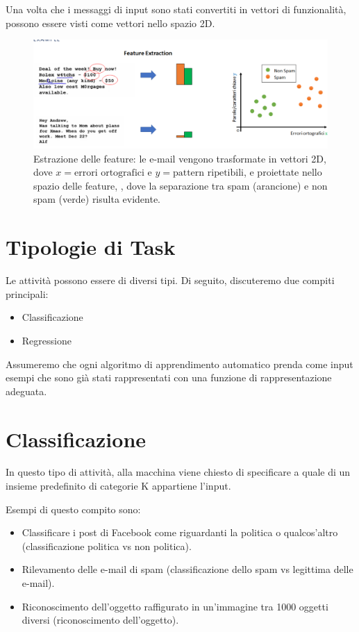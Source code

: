 Una volta che i messaggi di input sono stati convertiti in vettori di funzionalità, possono essere visti come vettori nello spazio 2D.

\begin{figure}[htbp]
    \centering
    \includegraphics[width=\textwidth]{images/featureExtraction.png}
    \caption{Estrazione delle feature: le e-mail vengono trasformate in vettori 2D, dove $x = \text{errori ortografici e } y = \text{pattern ripetibili}$, e proiettate nello spazio delle feature, , dove la separazione tra spam (arancione) e non spam (verde) risulta evidente.}
    \label{fig:featureExtraction}
\end{figure}

\section{Tipologie di Task}

Le attività possono essere di diversi tipi. Di seguito, discuteremo due compiti principali:

\begin{itemize}
\item Classificazione
\item Regressione
\end{itemize}

Assumeremo che ogni algoritmo di apprendimento automatico prenda come input esempi che sono già stati rappresentati con una funzione di rappresentazione adeguata.

\section{Classificazione}

In questo tipo di attività, alla macchina viene chiesto di specificare a quale di un insieme predefinito di categorie K appartiene l'input.

\noindent
Esempi di questo compito sono:

\begin{itemize}
\item Classificare i post di Facebook come riguardanti la politica o qualcos'altro (classificazione politica vs non politica).
\item Rilevamento delle e-mail di spam (classificazione dello spam vs legittima delle e-mail).
\item Riconoscimento dell'oggetto raffigurato in un'immagine tra 1000 oggetti diversi (riconoscimento dell'oggetto).
\end{itemize}

